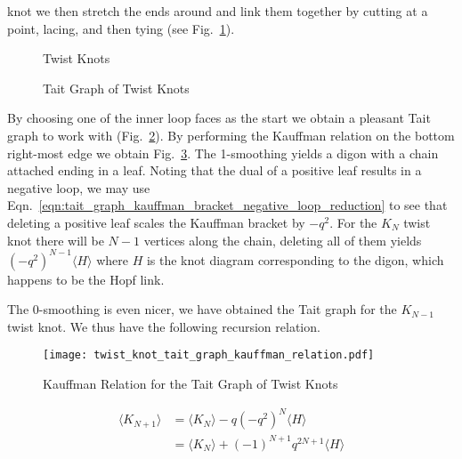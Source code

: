 \documentclass{article}
\theoremstyle{plain}
\begin{document}
        knot we then stretch the ends around and link them together by
        cutting at a point, lacing, and then tying
        (see Fig.~\ref{fig:twist_knot_001}).
        \begin{figure}
            \centering
            \caption{Twist Knots}
            \label{fig:twist_knot_001}
        \end{figure}
        \begin{figure}
            \centering
            \caption{Tait Graph of Twist Knots}
            \label{fig:twist_knot_tait_graph_001}
        \end{figure}
        By choosing one of the inner loop faces as the start we obtain a
        pleasant Tait graph to work with
        (Fig.~\ref{fig:twist_knot_tait_graph_001}). By performing the
        Kauffman relation on the bottom right-most edge we obtain
        Fig.~\ref{fig:twist_knot_tait_graph_kauffman_relation}. The
        1-smoothing yields a digon with a chain attached ending in a leaf.
        Noting that the dual of a positive leaf results in a negative loop,
        we may use
        Eqn.~\ref{eqn:tait_graph_kauffman_bracket_negative_loop_reduction} to
        see that deleting a positive leaf scales the Kauffman bracket by
        $-q^{2}$. For the $K_{N}$ twist knot there will be
        $N-1$ vertices along the chain, deleting all of them yields
        $(-q^{2})^{N-1}\langle{H}\rangle$ where $H$ is the knot diagram
        corresponding to the digon, which happens to be the Hopf link.
        \par\hfill\par
        The 0-smoothing is even nicer, we have obtained the Tait graph for
        the $K_{N-1}$ twist knot. We thus have the following recursion
        relation.
        \begin{figure}
            \centering
            \texttt{[image: twist\_knot\_tait\_graph\_kauffman\_relation.pdf]}
            \caption{Kauffman Relation for the Tait Graph of Twist Knots}
            \label{fig:twist_knot_tait_graph_kauffman_relation}
        \end{figure}
        \begin{align}
            \langle{K_{N+1}}\rangle
            &=\langle{K_{N}}\rangle
            -q(-q^{2})^{N}\langle{H}\rangle\\
            &=\langle{K_{N}}\rangle
            +(-1)^{N+1}q^{2N+1}\langle{H}\rangle
        \end{align}
\end{document}
